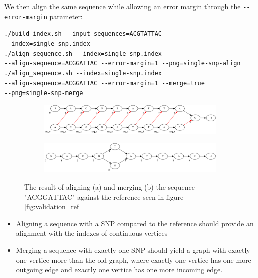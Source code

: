\documentclass[thesis.tex]{subfiles}
\begin{document}
We then align the same sequence while allowing an error margin through the \texttt{-{}-error-margin} parameter:\\
\par\noindent
\texttt{./build\_index.sh -{}-input-sequences=ACGTATTAC\\
-{}-index=single-snp.index}\\
\texttt{./align\_sequence.sh -{}-index=single-snp.index\\
-{}-align-sequence=ACGGATTAC -{}-error-margin=1 -{}-png=single-snp-align}\\
\texttt{./align\_sequence.sh -{}-index=single-snp.index\\
-{}-align-sequence=ACGGATTAC -{}-error-margin=1 -{}-merge=true \\
-{}-png=single-snp-merge}\\
\begin{figure}[!h]
  \begin{mdframed}
  \begin{subfigure}[t]{\textwidth}
      \includegraphics[width=\textwidth]{output/single-snp-align.png}
    \subcaption{}
  \end{subfigure}
  \begin{subfigure}[t]{\textwidth}
      \includegraphics[width=\textwidth]{output/single-snp-merge.png}
    \subcaption{}
  \end{subfigure} 
\end{mdframed}
  \caption{The result of aligning (a) and merging (b) the sequence "ACGGATTAC" against the reference seen in figure \ref{fig:validation_ref}}
  \label{fig:validation_single_snp}
\end{figure}
\begin{itemize}
\item Aligning a sequence with a SNP compared to the reference should provide an alignment with the indexes of continuous vertices
\item Merging a sequence with exactly one SNP should yield a graph with exactly one vertice more than the old graph, where exactly one vertice has one more outgoing edge and exactly one vertice has one more incoming edge.
\end{itemize}
\end{document}
